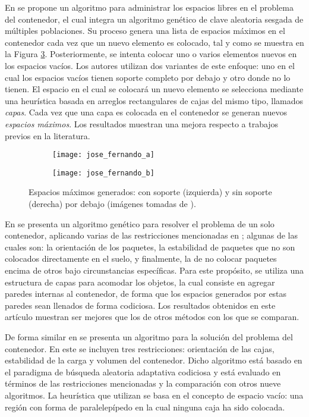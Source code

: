 En \cite{GONCALVES2012179} se propone un algoritmo para administrar los espacios libres en el problema del contenedor, el cual integra un algoritmo genético de clave aleatoria sesgada de múltiples poblaciones.
Su proceso genera una lista de espacios máximos en el contenedor cada vez que un nuevo elemento es colocado, tal y como se muestra en la Figura \ref{fig:GONCALVES2012179}.
Posteriormente, se intenta colocar uno o varios elementos nuevos en los espacios vacíos.
Los autores utilizan dos variantes de este enfoque: uno en el cual los espacios vacíos tienen soporte completo por debajo y otro donde no lo tienen. 
El espacio en el cual se colocará un nuevo elemento se selecciona mediante una heurística basada en arreglos rectangulares de cajas del mismo tipo, llamados \textsl{capas}.
Cada vez que una capa es colocada en el contenedor se generan nuevos \textsl{espacios máximos}.
Los resultados muestran una mejora respecto a trabajos previos en la literatura.
%
\begin{figure}[H]
	\begin{subfigure}{0.22\linewidth}
		\texttt{[image: jose\_fernando\_a]}%
		\label{subfig:con_soporte}%
	\end{subfigure}%
	\hspace{1.8cm}%
	\begin{subfigure}{0.22\textwidth}
		\texttt{[image: jose\_fernando\_b]}%
		\label{subfig:sin_soporte}%
	\end{subfigure}%
	\caption{Espacios máximos generados: con soporte (izquierda) y sin soporte (derecha) por debajo (imágenes tomadas de \cite{GONCALVES2012179}).}%
	\label{fig:GONCALVES2012179}%
\end{figure}
%
En \cite{BORTFELDT2001143} se presenta un algoritmo genético para resolver el problema de un solo contenedor, aplicando varias de las restricciones mencionadas en \cite{BISCHOFF1995377}; algunas de las cuales son: la orientación de los paquetes, la estabilidad de paquetes que no son colocados directamente en el suelo, y finalmente, la de no colocar paquetes encima de otros bajo circunstancias específicas.
Para este propósito, se utiliza una estructura de capas para acomodar los objetos, la cual consiste en agregar paredes internas al contenedor, de forma que los espacios generados por estas paredes sean llenados de forma codiciosa.
Los resultados obtenidos en este artículo muestran ser mejores que los de otros métodos con los que se comparan.

De forma similar en \cite{1492318} se presenta un algoritmo para la solución del problema del contenedor. 
En este se incluyen tres restricciones: orientación de las cajas, estabilidad de la carga y volumen del contenedor. 
Dicho algoritmo está basado en el paradigma de búsqueda aleatoria adaptativa codiciosa y está evaluado en términos de las restricciones mencionadas y la comparación con otros nueve algoritmos.
La heurística que utilizan se basa en el concepto de espacio vacío: una región con forma de paralelepípedo en la cual ninguna caja ha sido colocada.


